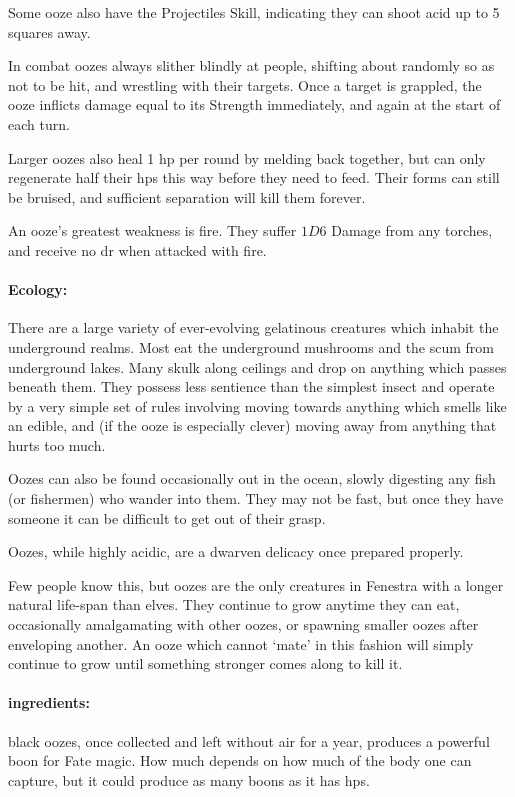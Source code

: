 \begin{multicols}{2}
Some ooze also have the Projectiles Skill, indicating they can shoot acid up to 5 squares away.

In combat oozes always slither blindly at people, shifting about randomly so as not to be hit, and wrestling with their targets.
Once a target is grappled, the ooze inflicts damage equal to its Strength immediately, and again at the start of each turn.

Larger oozes also heal 1 \gls{hp} per round by melding back together, but can only regenerate half their \glspl{hp} this way before they need to feed.
Their forms can still be bruised, and sufficient separation will kill them forever.

An ooze's greatest weakness is fire.
They suffer $1D6$ Damage from any torches, and receive no \gls{dr} when attacked with fire.

\paragraph{Ecology:} There are a large variety of ever-evolving gelatinous creatures which inhabit the underground realms.
Most eat the underground mushrooms and the scum from underground lakes.
Many skulk along ceilings and drop on anything which passes beneath them.
They possess less sentience than the simplest insect and operate by a very simple set of rules involving moving towards anything which smells like an edible, and (if the ooze is especially clever) moving away from anything that hurts too much.

Oozes can also be found occasionally out in the ocean, slowly digesting any fish (or fishermen) who wander into them.
They may not be fast, but once they have someone it can be difficult to get out of their grasp.

Oozes, while highly acidic, are a dwarven delicacy once prepared properly.

Few people know this, but oozes are the only creatures in Fenestra with a longer natural life-span than elves.
They continue to grow anytime they can eat, occasionally amalgamating with other oozes, or spawning smaller oozes after enveloping another.
An ooze which cannot `mate' in this fashion will simply continue to grow until something stronger comes along to kill it.

\jelly


\paragraph{\Glspl{ingredient}:}
black oozes, once collected and left without air for a year, produces a powerful \gls{boon} for Fate magic.
How much depends on how much of the body one can capture, but it could produce as many \glspl{boon} as it has \glspl{hp}.


\end{multicols}

